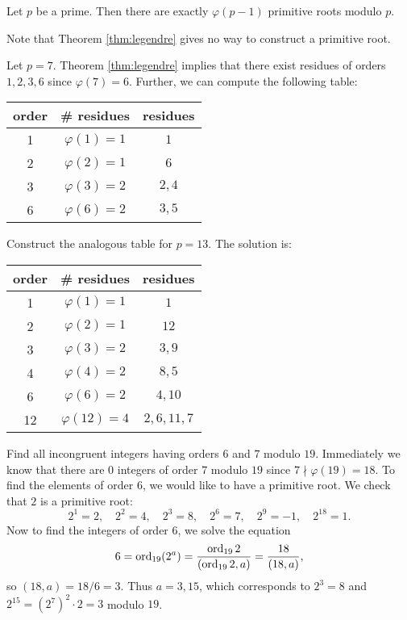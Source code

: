 \begin{corollary}
  Let $p$ be a prime. Then there are
  exactly $\varphi(p - 1)$ primitive
  roots modulo $p$.
\end{corollary}

\begin{remark}
  Note that Theorem \ref{thm:legendre}
  gives no way to construct a primitive
  root.
\end{remark}

\begin{example}
  Let $p = 7$. Theorem \ref{thm:legendre}
  implies that there exist residues
  of orders $1, 2, 3, 6$ since
  $\varphi(7) = 6$. Further, we can
  compute the following table:
  \begin{center}
    \begin{tabular}{c|c|c}
      order & \# residues & residues \\
      \hline
      1 & $\varphi(1) = 1$ & $1$\\
      2 & $\varphi(2) = 1$ & $6$\\
      3 & $\varphi(3) = 2$ & $2, 4$ \\
      6 & $\varphi(6) = 2$ & $3, 5$
    \end{tabular}
  \end{center}
\end{example}

\begin{exercise}
  Construct the analogous table for $p = 13$.
  The solution is:
  \begin{center}
    \begin{tabular}{c|c|c}
      order & \# residues & residues \\
      \hline
      1 & $\varphi(1) = 1$ & $1$\\
      2 & $\varphi(2) = 1$ & $12$\\
      3 & $\varphi(3) = 2$ & $3, 9$ \\
      4 & $\varphi(4) = 2$ & $8, 5$ \\
      6 & $\varphi(6) = 2$ & $4, 10$ \\
      12 & $\varphi(12) = 4$ & $2, 6, 11, 7$
    \end{tabular}
  \end{center}
\end{exercise}

\begin{example}
  Find all incongruent integers having
  orders $6$ and $7$ modulo $19$.
  Immediately we know that there are
  $0$ integers of order $7$ modulo
  $19$ since $7 \nmid \varphi(19) = 18$.
  To find the elements of order $6$,
  we would like to have a primitive root.
  We check that $2$ is a primitive
  root:
  \[
    2^1 = 2, \quad
    2^2 = 4, \quad 2^3 = 8, \quad
    2^6 = 7, \quad 2^9
    = -1, \quad 2^{18} = 1.
  \]
  Now to find the integers of order $6$,
  we solve the equation
  \[
    6 = \operatorname{ord}_{19}(2^a)
    = \frac{\operatorname{ord}_{19} 2}{(\operatorname{ord}_{19} 2, a)}
    = \frac{18}{(18, a)},
  \]
  so $(18, a) = 18 / 6 = 3$.
  Thus $a = 3, 15$,
  which corresponds to
  $2^3 = 8$ and $2^{15} = (2^7)^2 \cdot 2 = 3$ modulo $19$.
\end{example}

